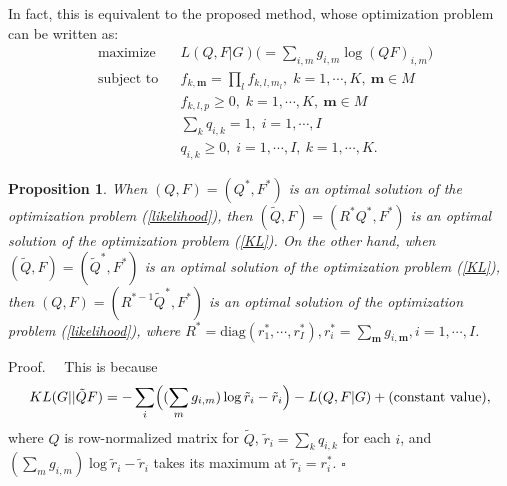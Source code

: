 \documentclass{article}
\newtheorem{prop}[thm]{Proposition}
\newcommand{\proof}{\noindent Proof.\ \ }
\begin{document}
In fact, this is equivalent to the proposed method, whose optimization problem can be written as:
\begin{equation}
\begin{aligned}
& \text{maximize}
& & L(Q, F | G) \bigl(= \sum_{i,m}  g_{i,m} \log (Q F)_{i,m} \bigr)  \\
& \text{subject to}
& & f_{k, \bm{m}} = \prod_l f_{k, l, m_l}, \; k = 1, \cdots, K,\ \bm{m} \in M \\ & 
& & f_{k, l, p} \geq 0, \; k = 1, \cdots, K,\ \bm{m} \in M \\ & 
& & \sum_k  q_{i, k} =  1, \; i = 1, \cdots, I \\ &
& & q_{i, k} \geq 0, \; i = 1, \cdots, I,\ k = 1, \cdots, K.
\end{aligned}
\label{likelihood}
\end{equation}

\begin{prop}
When $(Q, F) = (Q^*, F^*)$ is an optimal solution of the optimization problem (\ref{likelihood}), 
then $(\tilde{Q}, F) = (R^* Q^*, F^*)$ is an optimal solution of the optimization problem (\ref{KL}).
On the other hand, when $(\tilde{Q}, F) = (\tilde{Q}^*, F^*)$ is an optimal solution of the optimization problem (\ref{KL}),
then $(Q, F) = (R^{*-1} \tilde{Q}^*, F^*)$ is an optimal solution of the optimization problem (\ref{likelihood}),
where $R^* = \text{diag} (r_1^*, \cdots, r_I^*), r_i^* = \sum_{\bm{m}} g_{i,\bm{m}}, i = 1, \cdots, I$.
\end{prop}
\proof
This is because
\begin{equation*}
KL(G ||  \tilde{Q} F) = -  \sum_i \Bigl( ( \sum_{m} g_{i, m} ) \log \tilde{r}_i - \tilde{r}_i \Bigr)  - L(Q, F | G) + \text{(constant value)},
\end{equation*}
where $Q$ is row-normalized matrix for $\tilde{Q}$, $\tilde{r}_i = \sum_k q_{i, k}$ for each $i$, 
and $( \sum_{m} g_{i, m} ) \log \tilde{r}_i - \tilde{r}_i$ takes its maximum at $\tilde{r}_i = r_i^*$.
\hfill $\square$

% 
%
%
%
%




\clearpage
\end{document}
